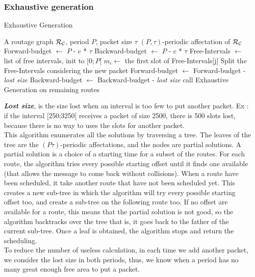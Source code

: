 \documentclass[a4paper,10pt]{article}
\begin{document}
    \subsubsection{Exhaustive generation}
	\begin{algorithm}[H]
	\caption{Exhaustive Generation}  
	\begin{algorithmic}
	\REQUIRE A routage graph ${\cal R}_{\cal C}$, period $P$, packet size $\tau$
	\ENSURE $(P,\tau)$-periodic affectation of ${\cal R}_{\cal C}$
	\STATE Forward-budget $\leftarrow$ $P$ - {\cal c} * $\tau$
	\STATE Backward-budget $\leftarrow$ $P$ - {\cal c} * $\tau$
	\STATE Free-Intervals $\leftarrow$ list of free intervals, init to $[0;P[$
	\STATE $m_i \leftarrow $ the first slot of Free-Intervals[j]
	\STATE Split the Free-Intervals considering the new packet
	\STATE Forward-budget $\leftarrow$ Forward-budget - {\em lost size}
	\STATE Backward-budget $\leftarrow$ Backward-budget - {\em lost size}
	\STATE call Exhaustive Generation on remaining routes
	\ENDIF
	\ENDFOR
	\ENDFOR


      \end{algorithmic}
      \end{algorithm}
      {\bf {\em Lost size}}, is the size lost when an interval is too few to put another packet. Ex : if the interval [250;3250[ receives a packet of size 2500, there is 500 slots lost, because there is no way to uses the slots for another packet.\\
      
	    
      This algorithm enumerates all the solutions by traversing a tree. The leaves of the tree are 
      the $(P\tau)$-periodic affectations, and the nodes are partial solutions. A partial solution is a choice of a starting time for a subset of the routes.
      For each route, the algorithm tries every possible starting offset until it finds one available (that allows the message to come back without collisions). When a route have been scheduled, it take another route that have not been scheduled yet.
      This creates a new sub-tree in which the algorithm will try every possible starting offset too, and create a sub-tree on the following route too.
      If no offset are available for a route, this means that the partial solution is not good, so the algorithm backtracks over the tree that is,
      it goes back to the father of the current sub-tree.
      Once a leaf is obtained, the algorithm stops and return the scheduling.\\      
      To reduce the number of useless calculation, in each time we add another packet, we consider the lost size in both periods, thus, we know when a period has no many great enough free area to put a packet.
\end{document}
